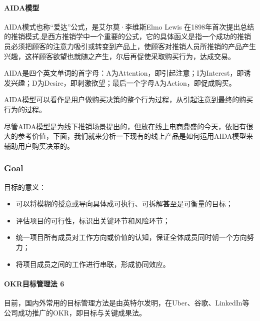 \documentclass[letterpaper,10pt,english]{sphinxmanual}
\begin{document}
\paragraph{AIDA模型}
\label{\detokenize{chapter_idea/attention:aida}}
AIDA模式也称“爱达”公式，是艾尔莫·李维斯Elmo Lewis
在1898年首次提出总结的推销模式,是西方推销学中一个重要的公式，它的具体函义是指一个成功的推销员必须把顾客的注意力吸引或转变到产品上，使顾客对推销人员所推销的产品产生兴趣，这样顾客欲望也就随之产生，尔后再促使采取购买行为，达成交易。

AIDA是四个英文单词的首字母：A为Attention，即引起注意；I为Interest，即诱发兴趣；D为Desire，即刺激欲望；最后一个字母A为Action，即促成购买。

AIDA模型可以看作是用户做购买决策的整个行为过程，从引起注意到最终的购买行为的过程。

尽管AIDA模型是为线下推销场景提出的，但放在线上电商鼎盛的今天，依旧有很大的参考价值，下面，我们就来分析一下现有的线上产品是如何运用AIDA模型来辅助用户购买决策的。


\subsubsection{Goal}
\label{\detokenize{chapter_idea/goal:goal}}\label{\detokenize{chapter_idea/goal::doc}}
目标的意义：
\begin{itemize}
\item {} 
可以将模糊的授意或导向具体成可执行、可拆解甚至是可衡量的目标；

\item {} 
评估项目的可行性，标识出关键环节和风险环节；

\item {} 
统一项目所有成员对工作方向或价值的认知，保证全体成员同时朝一个方向努力；

\item {} 
将项目成员之间的工作进行串联，形成协同效应。

\end{itemize}


\paragraph{OKR目标管理法 6\sphinxfootnotemark[422]}
\label{\detokenize{chapter_idea/goal:okr-6}}%
\begin{footnotetext}[422]\sphinxAtStartFootnote
{}
%
\end{footnotetext}\ignorespaces 
目前，国内外常用的目标管理方法是由英特尔发明，在Uber、谷歌、LinkedIn等公司成功推广的OKR，即目标与关键成果法。
\end{document}
